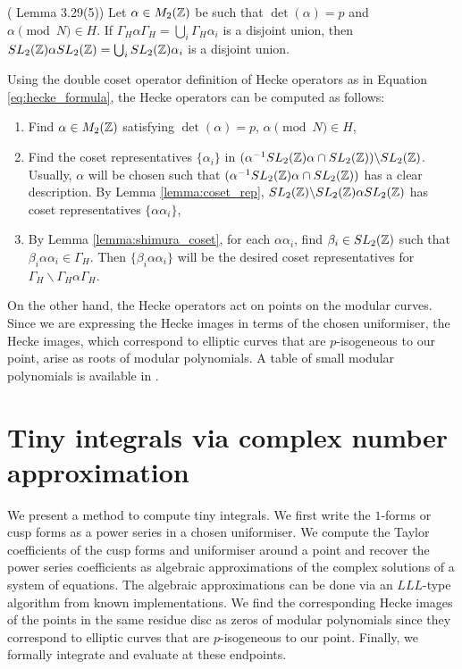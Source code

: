 \begin{lemma}{(\cite{shimura} Lemma 3.29(5))} \label{lemma:shimura_coset}
Let $\alpha \in M_2(\mathbb{Z})$ be such that $\det(\alpha) = p$ and $\alpha \pmod{N} \in H$. If $\Gamma_H \alpha \Gamma_H = \bigcup_i \Gamma_H \alpha_i$ is a disjoint union, then $SL_2(\mathbb{Z}) \alpha SL_2(\mathbb{Z}) = \bigcup_i SL_2(\mathbb{Z})\alpha_i$ is a disjoint union.
\end{lemma}

Using the double coset operator definition of Hecke operators as in Equation \ref{eq:hecke_formula}, the Hecke operators can be computed as follows:

\begin{enumerate}
    \item Find $\alpha \in M_2(\mathbb{Z})$ satisfying $\det(\alpha) = p$, $\alpha \pmod{N} \in H$,
    \item Find the coset representatives $\{\alpha_i\}$ in $(\alpha^{-1} SL_2(\mathbb{Z}) \alpha \cap  SL_2(\mathbb{Z}))\backslash SL_2(\mathbb{Z})$. Usually, $\alpha$ will be chosen such that $(\alpha^{-1} SL_2(\mathbb{Z}) \alpha \cap  SL_2(\mathbb{Z}))$ has a clear description. By Lemma \ref{lemma:coset_rep}, $SL_2(\mathbb{Z})\backslash SL_2(\mathbb{Z}) \alpha SL_2(\mathbb{Z})$ has coset representatives $\{\alpha \alpha_i\}$,
    \item By Lemma \ref{lemma:shimura_coset}, for each $\alpha \alpha_i$, find $\beta_i \in SL_2(\mathbb{Z})$ such that $\beta_i \alpha \alpha_i \in \Gamma_H$. Then $\{ \beta_i \alpha \alpha_i\}$ will be the desired coset representatives for $\Gamma_H \backslash \Gamma_H \alpha \Gamma_H$.
\end{enumerate}

On the other hand, the Hecke operators act on points on the modular curves. Since we are expressing the Hecke images in terms of the chosen uniformiser, the Hecke images, which correspond to elliptic curves that are $p$-isogeneous to our point, arise as roots of modular polynomials. A table of small modular polynomials is available in \cite{MP1,MP2}.

\section{Tiny integrals via complex number approximation}

We present a method to compute tiny integrals. We first write the $1$-forms or cusp forms as a power series in a chosen uniformiser. We compute the Taylor coefficients of the cusp forms and uniformiser around a point and recover the power series coefficients as algebraic approximations of the complex solutions of a system of equations. The algebraic approximations can be done via an $LLL$-type algorithm from known implementations. We find the corresponding Hecke images of the points in the same residue disc as zeros of modular polynomials since they correspond to elliptic curves that are $p$-isogeneous to our point. Finally, we formally integrate and evaluate at these endpoints.

